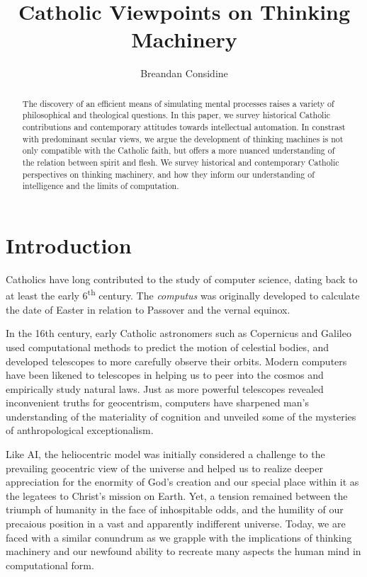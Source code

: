 \documentclass[sigplan,nonacm]{acmart}\settopmatter{printfolios=false,printccs=false,printacmref=false}
\begin{document}
  \title{Catholic Viewpoints on Thinking Machinery}
  \begin{abstract}
  The discovery of an efficient means of simulating mental processes raises a variety of philosophical and theological questions. In this paper, we survey historical Catholic contributions and contemporary attitudes towards intellectual automation. In constrast with predominant secular views, we argue the development of thinking machines is not only compatible with the Catholic faith, but offers a more nuanced understanding of the relation between spirit and flesh. We survey historical and contemporary Catholic perspectives on thinking machinery, and how they inform our understanding of intelligence and the limits of computation.
  \end{abstract}

  \author{Breandan Considine}

  \maketitle

  \section{Introduction}

  Catholics have long contributed to the study of computer science, dating back to at least the early 6\textsuperscript{th} century. The \textit{computus} was originally developed to calculate the date of Easter in relation to Passover and the vernal equinox.

  In the 16th century, early Catholic astronomers such as Copernicus and Galileo used computational methods to predict the motion of celestial bodies, and developed telescopes to more carefully observe their orbits. Modern computers have been likened to telescopes in helping us to peer into the cosmos and empirically study natural laws. Just as more powerful telescopes revealed inconvenient truths for geocentrism, computers have sharpened man's understanding of the materiality of cognition and unveiled some of the mysteries of anthropological exceptionalism.

  Like AI, the heliocentric model was initially considered a challenge to the prevailing geocentric view of the universe and helped us to realize deeper appreciation for the enormity of God's creation and our special place within it as the legatees to Christ's mission on Earth. Yet, a tension remained between the triumph of humanity in the face of inhospitable odds, and the humility of our precaious position in a vast and apparently indifferent universe. Today, we are faced with a similar conundrum as we grapple with the implications of thinking machinery and our newfound ability to recreate many aspects the human mind in computational form.
\end{document}
